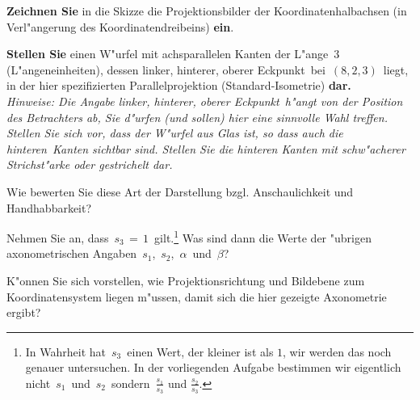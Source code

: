 \begin{Aufgabe}
\begin{center}
\end{center}
\enlargethispage{3ex}
\small
\begin{Teilaufgaben}
\setlength{\itemsep}{-0.5ex}
\item \textbf{Zeichnen Sie} in die Skizze die Projektionsbilder der Koordinatenhalbachsen (in Verl"angerung des Koordinatendreibeins) \textbf{ein}.
\item \textbf{Stellen Sie} einen W"urfel mit achsparallelen Kanten der L"ange\, $3$\, (L"angeneinheiten),
 dessen \glqq linker, hinterer, oberer Eckpunkt\grqq\ bei \,$(8,2,3)$\, liegt, in der hier spezifizierten Parallelprojektion (Standard-Isometrie) \textbf{dar.}
 \\[0.5ex]
{\footnotesize \textit{Hinweise:  Die Angabe \glqq linker, hinterer, oberer Eckpunkt\grqq\ h"angt von der Position des Betrachters ab, Sie d"urfen (und sollen) hier eine sinnvolle Wahl treffen. Stellen Sie sich vor, dass der W"urfel aus Glas ist, so dass auch die \glqq hinteren\grqq\ Kanten sichtbar sind. Stellen Sie die hinteren Kanten mit schw"acherer Strichst"arke oder gestrichelt dar.}}
\item Wie bewerten Sie diese Art der Darstellung bzgl. Anschaulichkeit und Handhabbarkeit?
\item Nehmen Sie an, dass\, $s_3 \,=\, 1$\, gilt.\footnote{In Wahrheit hat\, $s_3$\, einen Wert, der kleiner ist als $1$, wir werden das noch genauer untersuchen. In der vorliegenden Aufgabe bestimmen wir eigentlich nicht\, $s_1$\, und\, $s_2$\, sondern\,  $\tfrac{s_1}{s_3}$ und $\tfrac{s_2}{s_3}$.} Was sind dann die Werte der "ubrigen axonometrischen Angaben\, $s_1$,\, $s_2$,\, $\alpha$\, und \,$\beta$?
\item K"onnen Sie sich vorstellen, wie Projektionsrichtung und Bildebene zum Koordinatensystem liegen m"ussen, damit sich die hier gezeigte Axonometrie ergibt?
\end{Teilaufgaben}
\end{Aufgabe}
%